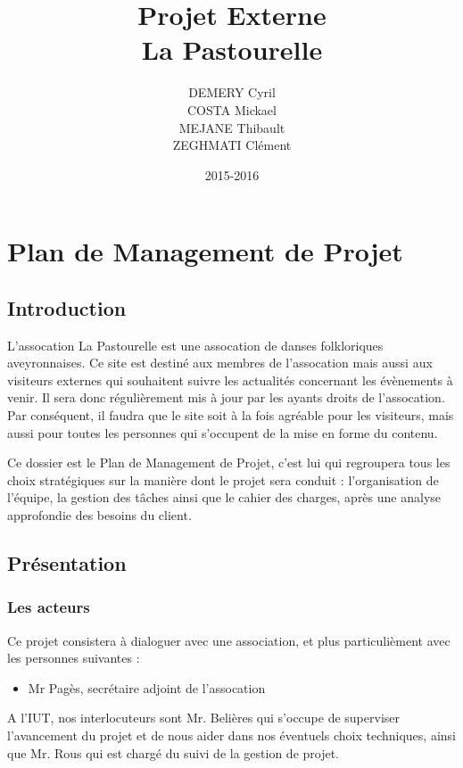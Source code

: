 \documentclass[11pt]{report}
\title{Projet Externe\\La Pastourelle}
\author{DEMERY Cyril\\COSTA Mickael\\MEJANE Thibault\\ZEGHMATI Clément}
\date{2015-2016}
\begin{document}
\maketitle
\setcounter{tocdepth}{5}
\tableofcontents
\chapter{Plan de Management de Projet}
\section{Introduction}
L'assocation La Pastourelle est une assocation de danses folkloriques 
aveyronnaises. Ce site est destiné aux membres de l'assocation mais aussi aux 
visiteurs externes qui souhaitent suivre les actualités concernant les 
évènements à venir. Il sera donc régulièrement mis à jour par les ayants 
droits de l'assocation. Par conséquent, il faudra que le site soit à la fois 
agréable pour les visiteurs, mais aussi pour toutes les personnes qui 
s'occupent de la mise en forme du contenu.\\

\par Ce dossier est le Plan de Management de Projet, c'est lui qui regroupera 
tous les choix stratégiques sur la manière dont le projet sera conduit : 
l'organisation de l'équipe, la gestion des tâches ainsi que le cahier des 
charges, après une analyse approfondie des besoins du client.

\section{Présentation}
\subsection{Les acteurs}
Ce projet consistera à dialoguer avec une association, et plus particulièment 
avec les personnes suivantes : 
\begin{itemize}
    \item Mr Pagès, secrétaire adjoint de l'assocation\\
\end{itemize}

\par A l'IUT, nos interlocuteurs sont Mr. Belières qui s'occupe de superviser 
l'avancement du projet et de nous aider dans nos éventuels choix techniques, 
ainsi que Mr. Rous qui est chargé du suivi de la gestion de projet.   \\
\end{document}

